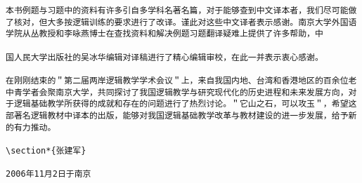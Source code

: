 \begin{verbatim}
本书例题与习题中的资料有许多引自多学科名著名篇，对于能够查到中文译本者，我们尽可能做了核对，但大多按逻辑训练的要求进行了改译。谨此对这些中文译者表示感谢。南京大学外国语学院从丛教授和李咏燕博士在查找资料和解决例题习题翻译疑难上提供了许多帮助，中

国人民大学出版社的吴冰华编辑对译稿进行了精心编辑审校，在此一并表示衷心感谢。

在刚刚结束的＂第二届两岸逻辑教学学术会议＂上，来自我国内地、台湾和香港地区的百余位老中青学者会聚南京大学，共同探讨了我国逻辑教学与研究现代化的历史进程和未来发展方向，对于逻辑基础教学所获得的成就和存在的问题进行了热烈讨论。＂它山之石，可以攻玉＂，希望这部著名逻辑教材中译本的出版，能够对我国逻辑基础教学改革与教材建设的进一步发展，给予新的有力推动。

\section*{张建军}

2006年11月2日于南京
\end{verbatim}